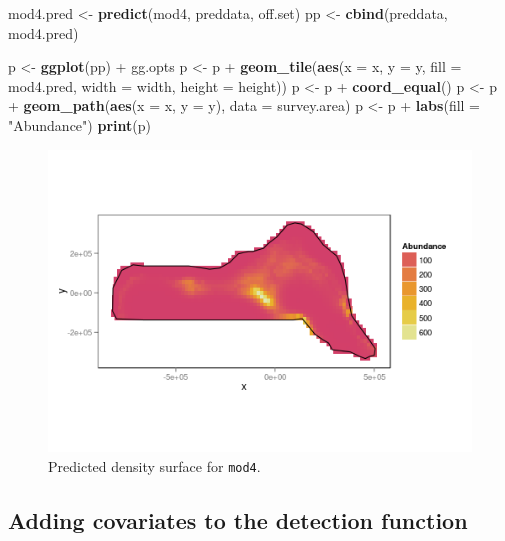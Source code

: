 \documentclass[]{article}
\newenvironment{Shaded}{}{}
\newcommand{\KeywordTok}[1]{\textcolor[rgb]{0.00,0.44,0.13}{\textbf{{#1}}}}
\newcommand{\DataTypeTok}[1]{\textcolor[rgb]{0.56,0.13,0.00}{{#1}}}
\newcommand{\StringTok}[1]{\textcolor[rgb]{0.25,0.44,0.63}{{#1}}}
\newcommand{\NormalTok}[1]{{#1}}
\begin{document}
\begin{Shaded}
\begin{Highlighting}[]
\NormalTok{mod4.pred <-}\StringTok{ }\KeywordTok{predict}\NormalTok{(mod4, preddata, off.set)}
\NormalTok{pp <-}\StringTok{ }\KeywordTok{cbind}\NormalTok{(preddata, mod4.pred)}

\NormalTok{p <-}\StringTok{ }\KeywordTok{ggplot}\NormalTok{(pp) +}\StringTok{ }\NormalTok{gg.opts}
\NormalTok{p <-}\StringTok{ }\NormalTok{p +}\StringTok{ }\KeywordTok{geom_tile}\NormalTok{(}\KeywordTok{aes}\NormalTok{(}\DataTypeTok{x =} \NormalTok{x, }\DataTypeTok{y =} \NormalTok{y, }\DataTypeTok{fill =} \NormalTok{mod4.pred, }\DataTypeTok{width =} \NormalTok{width, }\DataTypeTok{height =} \NormalTok{height))}
\NormalTok{p <-}\StringTok{ }\NormalTok{p +}\StringTok{ }\KeywordTok{coord_equal}\NormalTok{()}
\NormalTok{p <-}\StringTok{ }\NormalTok{p +}\StringTok{ }\KeywordTok{geom_path}\NormalTok{(}\KeywordTok{aes}\NormalTok{(}\DataTypeTok{x =} \NormalTok{x, }\DataTypeTok{y =} \NormalTok{y), }\DataTypeTok{data =} \NormalTok{survey.area)}
\NormalTok{p <-}\StringTok{ }\NormalTok{p +}\StringTok{ }\KeywordTok{labs}\NormalTok{(}\DataTypeTok{fill =} \StringTok{"Abundance"}\NormalTok{)}
\KeywordTok{print}\NormalTok{(p)}
\end{Highlighting}
\end{Shaded}

\begin{figure}[htbp]
\centering
\includegraphics{mexico-figs/mod4-pred.png}
\caption{Predicted density surface for \texttt{mod4}.}
\end{figure}

\subsection{Adding covariates to the detection
function}\label{adding-covariates-to-the-detection-function}
\end{document}
